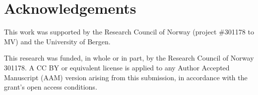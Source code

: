 \documentclass[]{article}
\begin{document}
\section{Acknowledgements}

This work was supported by the Research Council of Norway (project \#301178 to MV) and the University of Bergen.

This research was funded, in whole or in part, by the Research Council of Norway 301178. A CC BY or equivalent license is applied to any Author Accepted Manuscript (AAM) version arising from this submission, in accordance with the grant’s open access conditions.





\end{document}
